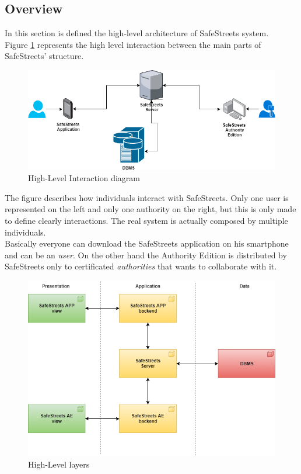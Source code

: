 \documentclass{article}
\begin{document}
		\subsection{Overview}
		In this section is defined the high-level architecture of SafeStreets system.\\ 
		Figure \ref{fig:hinteraction_diagram} represents the high level interaction between the main parts of SafeStreets' structure.
		\begin{figure}[H]
			\includegraphics [width=\textwidth] {diagrams/high-interaction.png}
			\caption[High-Level Interaction]{High-Level Interaction diagram}
			\label{fig:hinteraction_diagram}
		\end{figure}
		The figure describes how individuals interact with SafeStreets. Only one user is represented on the left and only one authority on the right, but this is only made to define clearly interactions. The real system is actually composed by multiple individuals.\\
		Basically everyone can download the SafeStreets application on his smartphone and can be an \textit{user}. On the other hand the Authority Edition is distributed by SafeStreets only to certificated \textit{authorities} that wants to collaborate with it. 
		\begin{figure}[H]
			\includegraphics [width=\textwidth] {diagrams/system_overview.png}
			\caption[High-Level Layers]{High-Level layers}
			\label{fig:hlayers}
		\end{figure}
\end{document}
